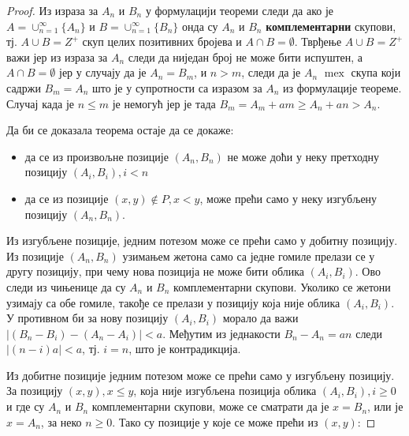 \documentclass[a4paper]{article}
\DeclareMathOperator{\mex}{mex}
\begin{document}
\begin{proof}
	
	Из израза за $ A_{n} $ и $ B_{n} $ у формулацији теореми следи да ако је $ A = \cup_{n=1}^{\infty}\{A_{n}\} $ и  $ B = \cup_{n=1}^{\infty}\{B_{n}\} $ онда су $ A_{n} $ и $ B_{n} $ \textbf{комплементарни} скупови, тј. $ A \cup B = Z^{+} $ скуп целих позитивних бројева  и $ A \cap B = \emptyset $. Тврђење $ A \cup B = Z^{+} $ важи јер из израза за $ A_{n} $ следи да ниједан број не може бити испуштен, а $ A \cap B = \emptyset $ јер у случају да је $ A_{n} = B_{m} $, и $ n > m $, следи да је $ A_{n} $ $ \mex $ скупа који садржи $ B_{m} = A_{n} $ што је у супротности са изразом за $ A_{n} $ из формулације теореме. Случај када је $ n \leq m $ је немогућ јер је тада $ B_{m} = A_{m} + am \geq  A_{n} + an > A_{n} $. 
	
	Да би се доказала теорема остаје да се докаже:
	\begin{itemize}
		\item да се из произвољне позиције $ (A_{n}, B_{n}) $ не може доћи у неку претходну позицију $ (A_{i}, B_{i}), i < n $
		\item да се из позиције $ (x, y) \notin P, x < y $, може прећи само у неку изгубљену позицију $ (A_{n}, B_{n}) $.
	\end{itemize}
	
	Из изгубљене позиције, једним потезом може се прећи само у добитну позицију. Из позиције $ (A_{n}, B_{n}) $ узимањем жетона само са једне гомиле прелази се у другу позицију, при чему нова позиција не може бити облика $ (A_{i}, B_{i}) $. Ово следи из чињенице да су  $ A_{n} $ и $ B_{n} $ комплементарни скупови. Уколико се жетони узимају са обе гомиле, такође се прелази у позицију која није облика $ (A_{i}, B_{i}) $. У противном би за нову позицију $ (A_{i}, B_{i}) $ морало да важи $ |(B_{n} - B_{i}) - (A_{n}-A_{i})| < a $. Међутим из једнакости $ B_{n} - A_{n} = an $ следи $ |(n-i)a| < a $, тј. $ i = n $, што је контрадикција. 
	
	Из добитне позиције једним потезом може се прећи само у изгубљену позицију. За позицију $ (x, y), x \le y $, која није изгубљена позиција облика $ (A_{i}, B_{i}), i \ge 0 $ и где су $ A_{n} $ и $ B_{n} $ комплементарни скупови, може се сматрати да је $ x = B_{n} $, или је $ x = A_{n} $, за неко $ n \ge 0 $. Тако су позиције у које се може прећи из $ (x, y) $:
	

\end{proof}
\end{document}
